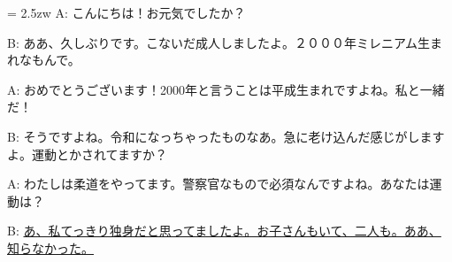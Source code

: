 \documentclass[11pt]{amsart}
\title{}
\author{}
\newenvironment{hangall}[1]{\hangindent = 2.5zw\everypar{\hangindent = 2.5zw}}{}
\begin{document}
\maketitle
\begin{hangall}{}%
A: こんにちは！お元気でしたか？

B: ああ、久しぶりです。こないだ成人しましたよ。２０００年ミレニアム生まれなもんで。

A: おめでとうございます！2000年と言うことは平成生まれですよね。私と一緒だ！

B: そうですよね。令和になっちゃったものなあ。急に老け込んだ感じがしますよ。運動とかされてますか？

A: わたしは柔道をやってます。警察官なもので必須なんですよね。あなたは運動は？

B: \ul{あ、私てっきり独身だと思ってましたよ。お子さんもいて、二人も。ああ、知らなかった。}\end{hangall}
\end{document}
